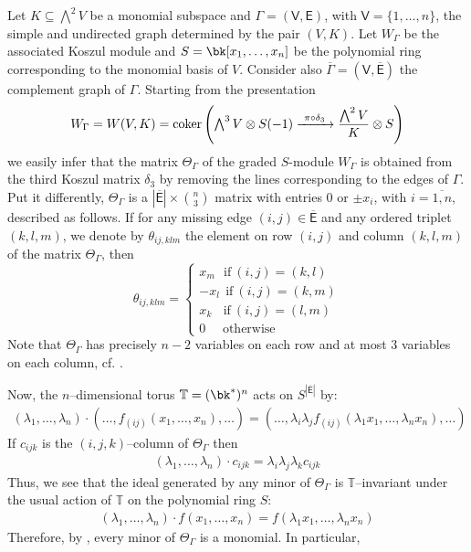 \documentclass[10pt, leqno]{amsart}
\begin{document}
Let $K \subseteq \bigwedge^2V$ be a monomial subspace and $\Gamma = (\mathsf{V}, \mathsf{E})$, with $\mathsf{V} = \{1,\ldots,n\}$, the simple and undirected graph determined by the pair $(V,K)$. Let $W_\Gamma$ be the associated Koszul module and $S = \bk[x_1,\ldots,x_n]$ be the polynomial ring corresponding to the monomial basis of $V$. Consider also $\overline{\Gamma} = (\mathsf{V},\overline{\mathsf{E}})$ the complement graph of $\Gamma$. Starting from the presentation
\begin{align*}
W_\Gamma = W(V,K) = \operatorname{coker} \left( \displaystyle \textstyle{\bigwedge^3 V} \otimes S(-1) \xrightarrow{\ \pi\circ\delta_3\ } \displaystyle\frac{\textstyle{\bigwedge^2 V}}{K} \otimes S\right)
\end{align*}
we easily infer that the matrix $\Theta_\Gamma$ of the graded $S$-module $W_\Gamma$ is obtained from the third Koszul matrix $\delta_3$ by removing the lines corresponding to the edges of $\Gamma$. Put it differently, $\Theta_\Gamma$ is a $| \overline{\mathsf{E}} | \times \binom{n}{3}$ matrix with entries $0$ or $\pm x_i$, with $i = \overline{1,n}$, described as follows. If for any missing edge $(i,j)\in \overline{\mathsf{E}}$ and any ordered triplet $(k,l,m)$, we denote by $\theta_{ij, klm}$ the element on row $(i,j)$ and column $(k,l,m)$ of the matrix $\Theta_\Gamma$, then 
\begin{equation} \label{eq:pres_matrix}
\theta_{ij, klm} = \left\{
\begin{array}{ll}
      x_m \ \ \ \text{if} \ (i,j) = (k,l) \\
      -x_l \ \ \text{if} \ (i,j) = (k,m)\\
      x_k \ \ \ \ \text{if} \ (i,j) = (l,m)\\
      0 \ \ \ \ \ \ \text{otherwise}
\end{array} 
\right. 
\end{equation}
Note that $\Theta_\Gamma$ has precisely $n-2$ variables on each row and at most $3$ variables on each column, cf. \cite[Section 8]{aprodu_reduced_2024}. 

\medskip

Now, the $n$--dimensional torus $\mathbb{T} = (\bk^*)^n$ acts on $S^{| \overline{\mathsf{E}}|}$ by:
\begin{align*}
(\lambda_1,\ldots,\lambda_n)\cdot(\ldots,f_{(ij)}(x_1,\ldots,x_n),\ldots) = (\ldots, \lambda_i\lambda_jf_{(ij)}(\lambda_1x_1,\ldots,\lambda_nx_n),\ldots)
\end{align*}
If $c_{ijk}$ is the $(i,j,k)$--column of $\Theta_\Gamma$ then
\begin{align*}
(\lambda_1,\ldots,\lambda_n)\cdot c_{ijk} = \lambda_i\lambda_j\lambda_k c_{ijk}
\end{align*}
Thus, we see that the ideal generated by any minor of $\Theta_\Gamma$ is $\mathbb{T}$--invariant under the usual action of $\mathbb{T}$ on the polynomial ring $S$:
\begin{align*}
(\lambda_1,\ldots,\lambda_n)\cdot f(x_1,\ldots,x_n) = f(\lambda_1x_1,\ldots,\lambda_nx_n)
\end{align*}
Therefore, by \cite[Proposition 2.1]{miller_2005}, every minor of $\Theta_\Gamma$ is a monomial. In particular,
\end{document}
